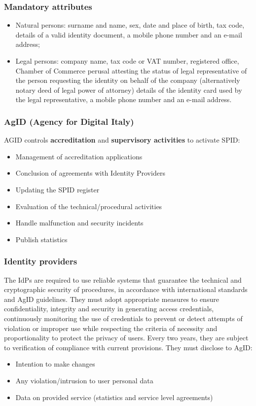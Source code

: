 \documentclass[a4paper, 10pt, titlepage]{article}
\begin{document}
\subsubsection{Mandatory attributes}
\begin{itemize}
\item Natural persons: surname and name, sex, date and place of birth, tax code, details of a valid identity document, a mobile phone number and an e-mail address;
\item Legal persons: company name, tax code or VAT number, registered office, Chamber of Commerce perusal attesting the status of legal representative of the person requesting the identity on behalf of the company (alternatively notary deed of legal power of attorney) details of the identity card used by the legal representative, a mobile phone number and an e-mail address.
\end{itemize}

\subsubsection{AgID (Agency for Digital Italy)}
AGID controls \textbf{accreditation} and \textbf{supervisory activities} to activate SPID:
\begin{itemize}
\item Management of accreditation applications
\item Conclusion of agreements with Identity Providers
\item Updating the SPID register
\item Evaluation of the technical/procedural activities
\item Handle malfunction and security incidents
\item Publish statistics
\end{itemize}

\subsubsection{Identity providers}
The IdPs are required to use reliable systems that guarantee the technical and cryptographic security of procedures, in accordance with international standards and AgID guidelines. They must adopt appropriate measures to ensure confidentiality, integrity and security in generating access credentials, continuously monitoring the use of credentials to prevent or detect attempts of violation or improper use while respecting the criteria of necessity and proportionality to protect the privacy of users. Every two years, they are subject to verification of compliance with current provisions. They must disclose to AgID:
\begin{itemize}
\item Intention to make changes
\item Any violation/intrusion to user personal data
\item Data on provided service (statistics and service level agreements)
\end{itemize}
\end{document}
